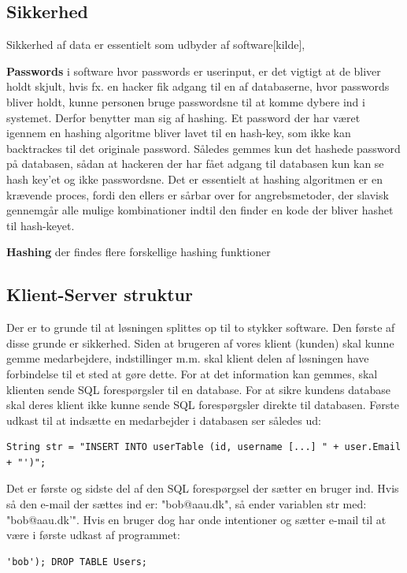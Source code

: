 \subsection{Sikkerhed}
Sikkerhed af data er essentielt som udbyder af  software[kilde],  

\textbf{Passwords}
i software hvor passwords er userinput, er det vigtigt at de bliver holdt skjult, hvis fx. en hacker fik adgang til en af databaserne, hvor passwords bliver holdt, kunne personen bruge passwordsne til at komme dybere ind i systemet. Derfor benytter man sig af hashing. Et password der har været igennem en hashing algoritme bliver lavet til en hash-key, som ikke kan backtrackes til det originale password. Således gemmes kun det hashede password på databasen, sådan at hackeren der har fået adgang til databasen kun kan se hash key'et og ikke passwordsne. Det er essentielt at hashing algoritmen er en krævende proces, fordi den ellers er sårbar over for angrebsmetoder, der slavisk gennemgår alle mulige kombinationer indtil den finder en kode der bliver hashet til hash-keyet. 

\textbf{Hashing}
der findes flere forskellige hashing funktioner 

\subsection{Klient-Server struktur}
Der er to grunde til at løsningen splittes op til to stykker software. Den første af disse grunde er sikkerhed. Siden at brugeren af vores klient (kunden) skal kunne gemme medarbejdere, indstillinger m.m. skal klient delen af løsningen have forbindelse til et sted at gøre dette. For at det information kan gemmes, skal klienten sende SQL forespørgsler til en database. For at sikre kundens database skal deres klient ikke kunne sende SQL forespørgsler direkte til databasen. Første udkast til at indsætte en medarbejder i databasen ser således ud:

\begin{lstlisting}
String str = "INSERT INTO userTable (id, username [...] " + user.Email + "')";
\end{lstlisting}

Det er første og sidste del af den SQL forespørgsel der sætter en bruger ind. Hvis så den e-mail der sættes ind er: "bob@aau.dk", så ender variablen str med: "bob@aau.dk'". Hvis en bruger dog har onde intentioner og sætter e-mail til at være i første udkast af programmet:
\begin{lstlisting}
'bob'); DROP TABLE Users;
\end{lstlisting}

